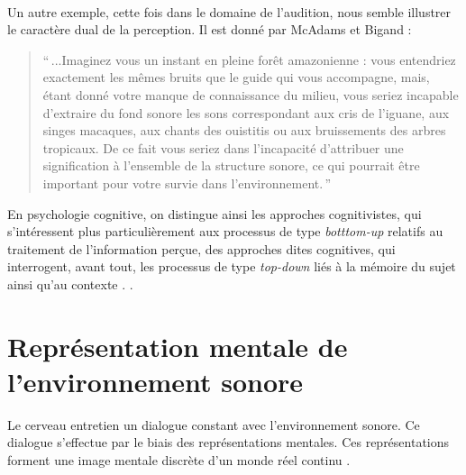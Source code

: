 \\

Un autre exemple, cette fois dans le domaine de l'audition, nous semble illustrer le caractère dual de la perception. Il est donné par McAdams et Bigand \citep[p. 2]{mcadams1994penser}:

\begin{quote}
``\,...Imaginez vous un instant en pleine forêt amazonienne : vous entendriez exactement les mêmes bruits que le guide qui vous accompagne, mais, étant donné votre manque de connaissance du milieu, vous seriez incapable d'extraire du fond sonore les sons correspondant aux cris de l'iguane, aux singes macaques, aux chants des ouistitis ou aux bruissements des arbres tropicaux. De ce fait vous seriez dans l'incapacité d'attribuer une signification à l'ensemble de la structure sonore, ce qui pourrait être important pour votre survie dans l'environnement.\,''
\end{quote}


En psychologie cognitive, on distingue ainsi les approches cognitivistes, qui s'intéressent plus particulièrement aux processus de type \emph{botttom-up} relatifs au traitement de l'information perçue, des approches dites cognitives, qui interrogent, avant tout, les processus de type \emph{top-down} liés à la mémoire du sujet ainsi qu'au contexte \citep[p. ??]{guastavino_etude_2003}.
.

\section{Représentation mentale de l'environnement sonore}

Le cerveau entretien un dialogue constant avec l'environnement sonore. Ce dialogue s'effectue par le biais des représentations mentales. Ces représentations forment une image mentale discrète d'un monde réel continu \citep{houde1998vocabulaire}. 

